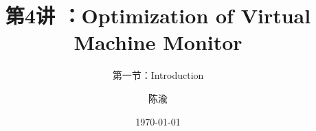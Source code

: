 


\title[第4讲]{第4讲 ：Optimization of Virtual Machine Monitor} %
\subtitle{第一节：Introduction }
\author{陈渝} %
\date{\today} %




\begin{frame}
\titlepage %
\end{frame}

